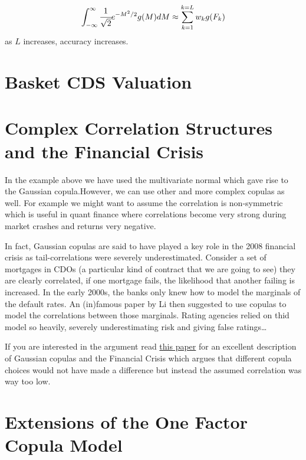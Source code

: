 \[\int_{-\infty}^{\infty}{\cfrac{1}{\sqrt{2}}e^{-M^{2}/2}g(M)dM} \approx \sum_{k=1}^{k=L}w_k g(F_k)\]
as $L$ increases, accuracy increases.

\section{Basket CDS Valuation}

\section{Complex Correlation Structures and the Financial
Crisis}\label{complex-correlation-structures-and-the-financial-crisis}

In the example above we have used the multivariate normal which gave
rise to the Gaussian copula.However, we can use other and more complex
copulas as well. For example we might want to assume the correlation is
non-symmetric which is useful in quant finance where correlations become
very strong during market crashes and returns very negative.

In fact, Gaussian copulas are said to have played a key role in the 2008
financial crisis as tail-correlations were severely underestimated.
Consider a set of mortgages in CDOs (a particular kind of contract that
we are going to see) they are clearly correlated, if one mortgage fails,
the likelihood that another failing is increased. In the early 2000s,
the banks only knew how to model the marginals of the default rates. An
(in)famous paper by Li then suggested to use copulas to model the
correlations between those marginals. Rating agencies relied on thid
model so heavily, severely underestimating risk and giving false
ratings\ldots

If you are interested in the argument read
\href{http://timmurphy.org/2009/07/22/line-spacing-in-latex-documents/}{this paper}
for an excellent description of Gaussian copulas and the Financial
Crisis which argues that different copula choices would not have made a
difference but instead the assumed correlation was way too low.

\section{Extensions of the One Factor Copula Model}


